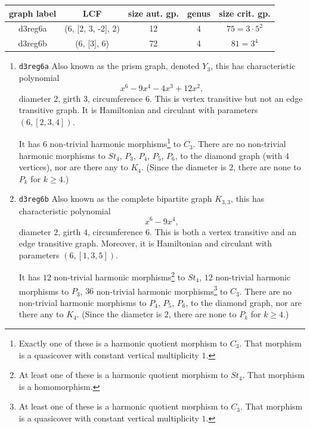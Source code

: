 \documentclass[12pt,letterpaper]{article}
\theoremstyle{definition}
\begin{document}
\begin{center}
\begin{tabular}{c|c|c|c|c}
  graph label & LCF                 & size aut. gp. & genus & size crit. gp. \\ \hline
  d3reg6a    & (6, [2, 3, -2], 2)   & 12            & 4    & $75=3\cdot 5^2$ \\
  d3reg6b    & (6, [3], 6)         & 72             & 4    & $81=3^4$ \\
\end{tabular}
\end{center}  

\begin{enumerate}
\item
  {\tt d3reg6a}\newline
{}  
Also known as the prism graph, denoted $Y_3$,
this has characteristic polynomial  
\[
x^6 - 9x^4 - 4x^3 + 12x^2,
\]
diameter $2$,
girth $3$,
circumference $6$.
This is vertex transitive but not an edge transitive graph. It is Hamiltonian and circulant
with parameters $(6, [2, 3, 4])$.

It has
$6$ non-trivial harmonic morphisms\footnote{Exactly one of these is a
harmonic quotient morphism to $C_3$. That morphism is a
quasicover with constant vertical multiplicity $1$.} to $C_3$.
There are no non-trivial harmonic morphisms to $St_4$, $P_3$, $P_4$, $P_5$, $P_6$, to the
diamond graph (with $4$ vertices), nor are there any to $K_4$.
(Since the diameter is $2$, there are none to $P_k$ for $k\geq 4$.)

\item
  {\tt d3reg6b}\newline
{}  
Also known as the complete bipartite graph $K_{3,3}$,
this has characteristic polynomial  
\[
x^6 - 9x^4,
\]
diameter $2$,
girth $4$,
circumference $6$.
This is both a vertex transitive and an edge transitive graph.
Moreover, it is Hamiltonian and circulant
with parameters $(6, [1, 3, 5])$.


It has $12$ non-trivial harmonic morphisms\footnote{At least one of these is a
harmonic quotient morphism to $St_4$. That morphism is a homomorphism.}
to $St_4$, $12$ non-trivial harmonic
morphisms to $P_3$,
$36$ non-trivial harmonic morphisms\footnote{At least one of these is a
harmonic quotient morphism to $C_3$. That morphism is a
quasicover with constant vertical multiplicity $1$.} to $C_3$.
There are no non-trivial harmonic morphisms to $P_4$, $P_5$, $P_6$, to the
diamond graph, nor are there any to $K_4$.
(Since the diameter is $2$, there are none to $P_k$ for $k\geq 4$.)
\end{enumerate}
\end{document}
